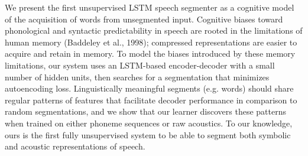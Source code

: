 We present the first unsupervised LSTM speech segmenter as a cognitive model of the acquisition of words from unsegmented input. Cognitive biases toward phonological and syntactic predictability in speech are rooted in the limitations of human memory (Baddeley et al., 1998); compressed representations are easier to acquire and retain in memory. To model the biases introduced by these memory limitations, our system uses an LSTM-based encoder-decoder with a small number of hidden units, then searches for a segmentation that minimizes autoencoding loss. Linguistically meaningful segments (e.g. words) should share regular patterns of features that facilitate decoder performance in comparison to random segmentations, and we show that our learner discovers these patterns when trained on either phoneme sequences or raw acoustics. To our knowledge, ours is the first fully unsupervised system to be able to segment both symbolic and acoustic representations of speech.

